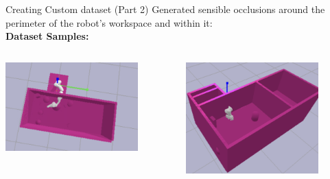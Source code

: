 \documentclass{beamer}
\begin{document}
\begin{frame}[t]{Creating Custom dataset (Part 2)}
    Generated sensible occlusions around the perimeter  of the robot's workspace and within it:
    \\
    \textbf{Dataset Samples:}
    \\
    \begin{columns}
		\begin{column}{.5\textwidth}
        \begin{center}
            \includegraphics[width=0.8\textwidth]{./img/ds_2_0.png}
        \end{center}
		\end{column}
		\begin{column}{.5\textwidth}
            \includegraphics[width=0.8\textwidth]{./img/ds_2_1.png}
		\end{column}
	\end{columns}
\end{frame}
\end{document}
